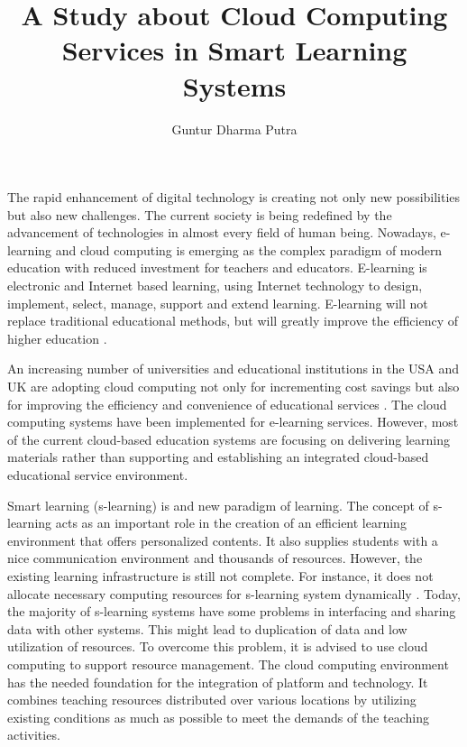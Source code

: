 \documentclass[journal]{vgtc}
\title{A Study about Cloud Computing Services in Smart Learning Systems}
\author{Guntur Dharma Putra}
\begin{document}
\maketitle

The rapid enhancement of digital technology is creating not only new possibilities but also new challenges. The current society is being redefined by the advancement of technologies in almost every field of human being. Nowadays, e-learning and cloud computing is emerging as the complex paradigm of modern education with reduced investment for teachers and educators. E-learning is electronic and Internet based learning, using Internet technology to design, implement, select, manage, support and extend learning. E-learning will not replace traditional educational methods, but will greatly improve the efficiency of higher education \cite{SudhirKumarSharmaNidhiGoyal2014}.

An increasing number of universities and educational institutions in the USA and UK are adopting cloud computing not only for incrementing cost savings but also for improving the efficiency and convenience of educational services \cite{jeong2013cloud}. The cloud computing systems have been implemented for e-learning services. However, most of the current cloud-based education systems are focusing on delivering learning materials rather than supporting and establishing an integrated cloud-based educational service environment.

Smart learning (s-learning) is and new paradigm of learning. The concept of s-learning acts as an important role in the creation of an efficient learning environment that offers personalized contents. It also supplies students with a nice communication environment and thousands of resources. However, the existing learning infrastructure is still not complete. For instance, it does not allocate necessary computing resources for s-learning system dynamically \cite{Uden2007}. Today, the majority of s-learning systems have some problems in interfacing and sharing data with other systems. This might lead to duplication of data and low utilization of resources. To overcome this problem, it is advised to use cloud computing to support resource management. The cloud computing environment has the needed foundation for the integration of platform and technology. It combines teaching resources distributed over various locations by utilizing existing conditions as much as possible to meet the demands of the teaching activities.
\end{document}
